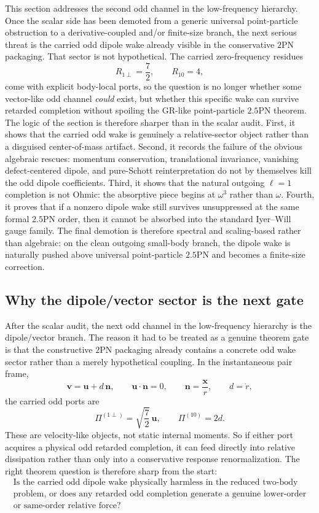 \documentclass[11pt]{article}
\begin{document}
This section addresses the second odd channel in the low-frequency hierarchy.
Once the scalar side has been demoted from a generic universal point-particle
obstruction to a derivative-coupled and/or finite-size branch, the next serious
threat is the carried odd dipole wake already visible in the conservative $2$PN
packaging.  That sector is not hypothetical.  The carried zero-frequency
residues
\[
R_{1\perp}=\frac72,
\qquad
R_{10}=4,
\]
come with explicit body-local ports, so the question is no longer whether some
vector-like odd channel \emph{could} exist, but whether this specific wake can
survive retarded completion without spoiling the GR-like point-particle
$2.5$PN theorem.  The logic of the section is therefore sharper than in the
scalar audit.  First, it shows that the carried odd wake is genuinely a
relative-sector object rather than a disguised center-of-mass artifact.
Second, it records the failure of the obvious algebraic rescues: momentum
conservation, translational invariance, vanishing defect-centered dipole, and
pure-Schott reinterpretation do not by themselves kill the odd dipole
coefficients.  Third, it shows that the natural outgoing $\ell=1$ completion is
not Ohmic: the absorptive piece begins at $\omega^3$ rather than $\omega$.
Fourth, it proves that if a nonzero dipole wake still survives unsuppressed at
the same formal $2.5$PN order, then it cannot be absorbed into the standard
Iyer--Will gauge family.  The final demotion is therefore spectral and
scaling-based rather than algebraic: on the clean outgoing small-body branch,
the dipole wake is naturally pushed above universal point-particle $2.5$PN and
becomes a finite-size correction.

\subsection{Why the dipole/vector sector is the next gate}
\label{sec:dipole-audit-next-gate}

After the scalar audit, the next odd channel in the low-frequency hierarchy is
the dipole/vector branch.  The reason it had to be treated as a genuine theorem
gate is that the constructive $2$PN packaging already contains a concrete odd
wake sector rather than a merely hypothetical coupling.  In the instantaneous
pair frame,
\[
\mathbf v=\mathbf u+d\,\mathbf n,
\qquad
\mathbf u\cdot\mathbf n=0,
\qquad
\mathbf n=\frac{\mathbf x}{r},
\qquad
 d=\dot r,
\]
the carried odd ports are
\[
\Pi^{(1\perp)}=\sqrt{\frac72}\,\mathbf u,
\qquad
\Pi^{(10)}=2d.
\]
These are velocity-like objects, not static internal moments.  So if either port
acquires a physical odd retarded completion, it can feed directly into relative
dissipation rather than only into a conservative response renormalization.  The
right theorem question is therefore sharp from the start:
\[
\boxed{\begin{gathered}
\text{Is the carried odd dipole wake physically harmless in the reduced two-body}\\
\text{problem, or does any retarded odd completion generate a genuine lower-order}\\
\text{or same-order relative force?}
\end{gathered}}
\]
\end{document}
